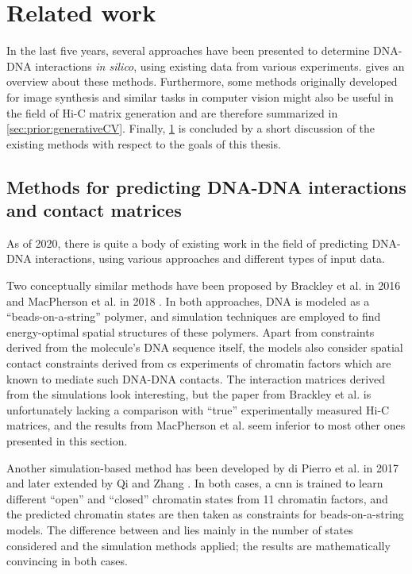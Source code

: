 \section{Related work}\label{sec:prior:relatedWork}
In the last five years, several approaches have been presented to determine DNA-DNA interactions \emph{in silico}, 
using existing data from various experiments.  gives an overview about these methods.
Furthermore, some methods originally developed for image synthesis and similar tasks in computer vision might also be useful 
in the field of Hi-C matrix generation and are therefore summarized in \autoref{sec:prior:generativeCV}.
Finally, \cref{sec:prior:relatedWork} is concluded by a short discussion of the existing methods with respect to the goals of this thesis.

\subsection{Methods for predicting DNA-DNA interactions and contact matrices} \label{sec:prior:predictingInteractions}
As of 2020, there is quite a body of existing work in the field of predicting DNA-DNA interactions, 
using various approaches and different types of input data.

Two conceptually similar methods have been proposed by Brackley et al. in 2016 and MacPherson et al. in 2018 \cite{Brackley2016, MacPherson2018}.
In both approaches, DNA is modeled as a ``beads-on-a-string'' polymer, and simulation techniques are employed to
find energy-optimal spatial structures of these polymers.
Apart from constraints derived from the molecule's DNA sequence itself, the models also consider spatial contact constraints derived from \acrshort{cs} experiments
of chromatin factors which are known to mediate such DNA-DNA contacts.
The interaction matrices derived from the simulations look interesting, 
but the paper from Brackley et al. \cite{Brackley2016} is unfortunately lacking a comparison with ``true'' experimentally measured Hi-C matrices, 
and the results from MacPherson et al. \cite{MacPherson2018} seem inferior to most other ones presented in this section.

Another simulation-based method has been developed by di Pierro et al. in 2017 \cite{Pierro2017} and later extended by Qi and Zhang \cite{Qi2019}. 
In both cases, a \acrfull{cnn} is trained to learn different ``open'' and ``closed'' chromatin states from 11 chromatin factors, 
and the predicted chromatin states are then taken as constraints for beads-on-a-string models.
The difference between \cite{Pierro2017} and \cite{Qi2019} lies mainly in the number of states considered and the simulation methods applied;
the results are mathematically convincing in both cases.

